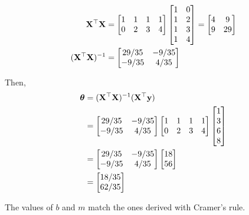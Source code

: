 \documentclass[12pt,letterpaper]{hmcpset}
\begin{document}
\begin{solution}
\begin{enumerate}
\begin{align*}
{\bf X}^\top {\bf X} &= \begin{bmatrix} 
  		1 & 1 & 1 & 1 \\
		0 & 2 & 3 & 4 \\
    	      \end{bmatrix}
	      \begin{bmatrix} 
    		1 & 0  \\
    		1 & 2  \\
		1 & 3  \\
    		1 & 4 
    	      \end{bmatrix}
	      =\begin{bmatrix} 
    		4 & 9  \\
    		9 & 29  \\
    	      \end{bmatrix} \\
({\bf X}^\top {\bf X})^{-1} &=  \begin{bmatrix} 
    		29/35 & -9/35  \\
    		-9/35 & 4/35 \\
    	      \end{bmatrix}
\end{align*}

Then,
\begin{align*}
\hbox{\boldmath$\theta$} &= ({\bf X}^\top {\bf X})^{-1} ({\bf X}^\top {\bf y}) \\
&= 	\begin{bmatrix} 
    		29/35 & -9/35  \\
    		-9/35 & 4/35 \\
    	\end{bmatrix}
	\begin{bmatrix} 
  		1 & 1 & 1 & 1 \\
		0 & 2 & 3 & 4 \\
   	\end{bmatrix}
	\begin{bmatrix} 
    		1  \\
    		3  \\
		6 \\
    		8
   	\end{bmatrix} \\
&= 	\begin{bmatrix} 
    		29/35 & -9/35  \\
    		-9/35 & 4/35 \\
    	\end{bmatrix}
	\begin{bmatrix} 
		18\\
		56
   	\end{bmatrix} \\
&=	\begin{bmatrix} 
		18/35\\
		62/35
   	\end{bmatrix}
\end{align*}

The values of $b$ and $m$ match the ones derived with Cramer's rule.


\end{enumerate}
    \vfill
\end{solution}
\newpage
\end{document}
